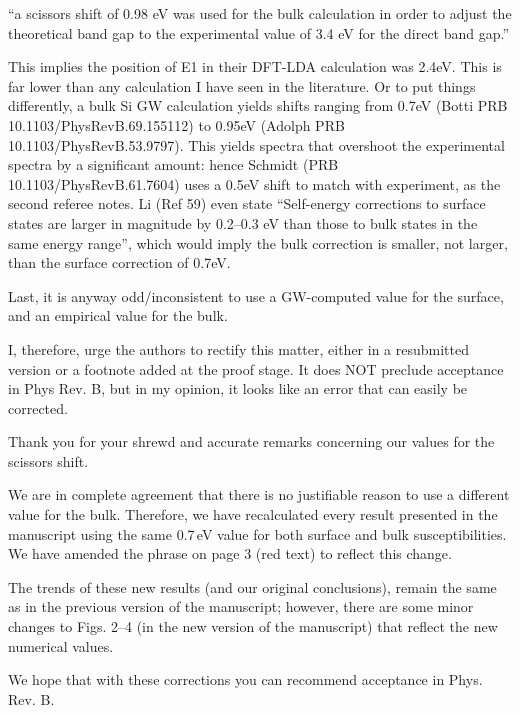 \documentclass{article}
\begin{document}
``a scissors shift of 0.98 eV was used for the bulk calculation in order to
adjust the theoretical band gap to the experimental value of 3.4 eV for the
direct band gap.''

This implies the position of E1 in their DFT-LDA calculation was 2.4eV. This is
far lower than any calculation I have seen in the literature. Or to put things
differently, a bulk Si GW calculation yields shifts ranging from 0.7eV (Botti
PRB 10.1103/PhysRevB.69.155112) to 0.95eV (Adolph PRB 10.1103/PhysRevB.53.9797).
This yields spectra that overshoot the experimental spectra by a significant
amount: hence Schmidt (PRB 10.1103/PhysRevB.61.7604) uses a 0.5eV shift to match
with experiment, as the second referee notes. Li (Ref 59) even state
``Self-energy corrections to surface states are larger in magnitude by 0.2--0.3
eV than those to bulk states in the same energy range'', which would imply the
bulk correction is smaller, not larger, than the surface correction of 0.7eV.

Last, it is anyway odd/inconsistent to use a GW-computed value for the surface,
and an empirical value for the bulk.

I, therefore, urge the authors to rectify this matter, either in a resubmitted
version or a footnote added at the proof stage. It does NOT preclude acceptance
in Phys Rev. B, but in my opinion, it looks like an error that can easily be
corrected.\\

\begin{shaded*}
Thank you for your shrewd and accurate remarks concerning our values for the
scissors shift.

We are in complete agreement that there is no justifiable reason to use a
different value for the bulk. Therefore, we have recalculated every result
presented in the manuscript using the same 0.7\,eV value for both surface and
bulk susceptibilities. We have amended the phrase on page 3 (red text) to
reflect this change.

The trends of these new results (and our original conclusions), remain the same
as in the previous version of the manuscript; however, there are some minor
changes to Figs. 2--4 (in the new version of the manuscript) that reflect the
new numerical values.

We hope that with these corrections you can recommend acceptance in Phys.
Rev. B.
\end{shaded*}
\end{document}
